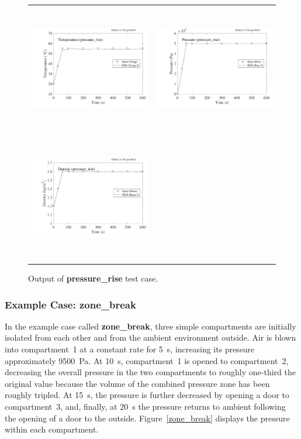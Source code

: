 \documentclass[11pt]{book}
\begin{document}
\begin{figure}[ht]
\begin{tabular*}{\textwidth}{lr}
\includegraphics[height=2.2in]{SCRIPT_FIGURES/pressure_rise_T} &
\includegraphics[height=2.2in]{SCRIPT_FIGURES/pressure_rise_P} \\
\includegraphics[height=2.2in]{SCRIPT_FIGURES/pressure_rise_R} &
\end{tabular*}
\caption[Output of {\bf pressure\_rise} test case.]{Output of {\bf pressure\_rise} test case.}
\label{pressure_rise}
\end{figure}


\subsubsection{Example Case: {\bf zone\_break}}

In the
example case called {\bf zone\_break}, three simple compartments are initially isolated from each other and from the ambient environment outside. Air
is blown into compartment~1 at a constant rate for 5~s, increasing its pressure approximately 9500~Pa. At 10~s, compartment~1 is opened to compartment~2, decreasing the
overall pressure in the two compartments to roughly one-third the original value because the volume of the combined pressure zone has been roughly tripled.
At 15~s, the pressure is further decreased by opening a door to compartment~3, and, finally, at 20~s the pressure returns to ambient following the opening
of a door to the outside. Figure~\ref{zone_break} displays the pressure within each compartment.
\end{document}
